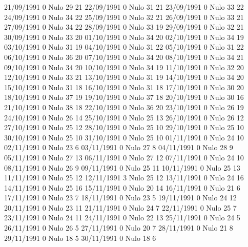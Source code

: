 21/09/1991  0     Nulo    29     21 
22/09/1991  0     Nulo    31     21 
23/09/1991  0     Nulo    33     22 
24/09/1991  0     Nulo    34     22 
25/09/1991  0     Nulo    32     21 
26/09/1991  0     Nulo    33     21 
27/09/1991  0     Nulo    34     22 
28/09/1991  0     Nulo    33     19 
29/09/1991  0     Nulo    32     21 
30/09/1991  0     Nulo    33     20 
01/10/1991  0     Nulo    34     20 
02/10/1991  0     Nulo    34     19 
03/10/1991  0     Nulo    31     19 
04/10/1991  0     Nulo    31     22 
05/10/1991  0     Nulo    31     22 
06/10/1991  0     Nulo    36     20 
07/10/1991  0     Nulo    34     20 
08/10/1991  0     Nulo    34     21 
09/10/1991  0     Nulo    34     20 
10/10/1991  0     Nulo    34     19 
11/10/1991  0     Nulo    32     20 
12/10/1991  0     Nulo    33     21 
13/10/1991  0     Nulo    31     19 
14/10/1991  0     Nulo    34     20 
15/10/1991  0     Nulo    31     18 
16/10/1991  0     Nulo    31     18 
17/10/1991  0     Nulo    30     20 
18/10/1991  0     Nulo    37     19 
19/10/1991  0     Nulo    37     18 
20/10/1991  0     Nulo    30     16 
21/10/1991  0     Nulo    38     18 
22/10/1991  0     Nulo    36     20 
23/10/1991  0     Nulo    26     19 
24/10/1991  0     Nulo    26     14 
25/10/1991  0     Nulo    25     13 
26/10/1991  0     Nulo    26     12 
27/10/1991  0     Nulo    25     12 
28/10/1991  0     Nulo    25     10 
29/10/1991  0     Nulo    25     10 
30/10/1991  0     Nulo    25     10 
31/10/1991  0     Nulo    25     10 
01/11/1991  0     Nulo    24     10 
02/11/1991  0     Nulo    23     6 
03/11/1991  0     Nulo    27     8 
04/11/1991  0     Nulo    28     9 
05/11/1991  0     Nulo    27     13 
06/11/1991  0     Nulo    27     12 
07/11/1991  0     Nulo    24     10 
08/11/1991  0     Nulo    26     9 
09/11/1991  0     Nulo    25     11 
10/11/1991  0     Nulo    25     13 
11/11/1991  0     Nulo    25     12 
12/11/1991  3     Nulo    25     12 
13/11/1991  0     Nulo    24     16 
14/11/1991  0     Nulo    25     16 
15/11/1991  0     Nulo    20     14 
16/11/1991  0     Nulo    21     6 
17/11/1991  0     Nulo    23     7 
18/11/1991  0     Nulo    23     5 
19/11/1991  0     Nulo    24     12 
20/11/1991  0     Nulo    23     11 
21/11/1991  0     Nulo    24     7 
22/11/1991  0     Nulo    25     7 
23/11/1991  0     Nulo    24     11 
24/11/1991  0     Nulo    22     13 
25/11/1991  0     Nulo    24     5 
26/11/1991  0     Nulo    26     5 
27/11/1991  0     Nulo    20     7 
28/11/1991  0     Nulo    21     8 
29/11/1991  0     Nulo    18     5 
30/11/1991  0     Nulo    18     6 
